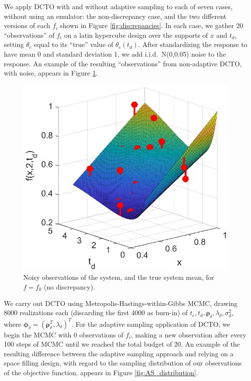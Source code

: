 \documentclass[10pt]{asme2ej}
\begin{document}
%
We apply DCTO with and without adaptive sampling to each of seven cases, without using an emulator: the non-discrepancy case, and the two different versions of each $f_i$ shown in Figure \ref{fig:discrepancies}.
%
In each case, we gather 20 ``observations'' of $f_i$ on a latin hypercube design over the supports of $x$ and $t_d$, setting $\theta_c$ equal to its ``true'' value of $\theta_c(t_d)$.
%
After standardizing the response to have mean 0 and standard deviation 1, we add i.i.d.\ N(0,0.05) noise to the response.
%
An example of the resulting ``observations'' from non-adaptive DCTO, with noise, appears in Figure \ref{fig:observed_data}.
%
\begin{figure}
	\centering
	\includegraphics[scale=0.85]{figures/figure_5.eps}
	\captionsetup{width=.85\linewidth}
	\caption{Noisy observations of the system, and the true system mean, for $f=f_0$ (no discrepancy).}
	\label{fig:observed_data}
\end{figure}
%
We carry out DCTO using Metropolis-Hastings-within-Gibbs MCMC, drawing 8000 realizations each (discarding the first 4000 as burn-in) of $t_c,t_d,\boldsymbol\rho_{\delta},\lambda_{\delta},\sigma^2_d$, where $\boldsymbol\phi_\delta = (\boldsymbol\rho_\delta^T,\lambda_\delta)^T$.
%
For the adaptive sampling application of DCTO, we begin the MCMC with 0 observations of $f_i$, making a new observation after every 100 steps of MCMC until we reached the total budget of 20.
%
An example of the resulting difference between the adaptive sampling approach and relying on a space filling design, with regard to the sampling distribution of our observations of the objective function, appears in Figure \ref{fig:AS_distribution}.
\end{document}
